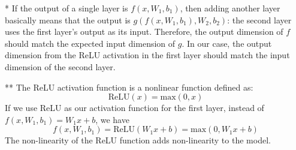 \documentclass[a4paper]{article}
\begin{document}
\begin{enumerate}
	* If the output of a single layer is $f(x, W_1, b_1)$, then adding another layer basically means that the output is $g(f(x, W_1, b_1), W_2, b_2)$: the second layer uses the first layer's output as its input. Therefore, the output dimension of $f$ should match the expected input dimension of $g$. In our case, the output dimension from the ReLU activation in the first layer should match the input dimension of the second layer.
	
	
	** The ReLU activation function is a nonlinear function defined as:
	\[
	  \textrm{ReLU}(x) = \textrm{max}(0, x)  
	\]
	If we use ReLU as our activation function for the first layer, instead of $f(x, W_1,b_1) = W_1x+b$, we have
	\[
	    f(x, W_1, b_1) = \textrm{ReLU}(W_1x+b) = \textrm{max}(0, W_1x+b)
	\]
	The non-linearity of the ReLU function adds non-linearity to the model.
	    
\end{enumerate}
\end{document}
